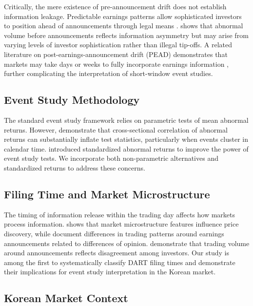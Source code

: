 \documentclass[review,authoryear]{elsarticle}
\begin{document}
Critically, the mere existence of pre-announcement drift does not establish information leakage. Predictable earnings patterns allow sophisticated investors to position ahead of announcements through legal means \citep{atiase1985predisclosure}. \citet{chae2005trading} shows that abnormal volume before announcements reflects information asymmetry but may arise from varying levels of investor sophistication rather than illegal tip-offs. A related literature on post-earnings-announcement drift (PEAD) demonstrates that markets may take days or weeks to fully incorporate earnings information \citep{bernard1989post, bernard1990evidence}, further complicating the interpretation of short-window event studies.

\subsection{Event Study Methodology}

The standard event study framework \citep{brown1985using, mackinlay1997event} relies on parametric tests of mean abnormal returns. However, \citet{kolari2010event} demonstrate that cross-sectional correlation of abnormal returns can substantially inflate test statistics, particularly when events cluster in calendar time. \citet{patell1976corporate} introduced standardized abnormal returns to improve the power of event study tests. We incorporate both non-parametric alternatives and standardized returns to address these concerns.

\subsection{Filing Time and Market Microstructure}

The timing of information release within the trading day affects how markets process information. \citet{lee1993market} shows that market microstructure features influence price discovery, while \citet{berkman2009sell} document differences in trading patterns around earnings announcements related to differences of opinion. \citet{bamber1997trading} demonstrate that trading volume around announcements reflects disagreement among investors. Our study is among the first to systematically classify DART filing times and demonstrate their implications for event study interpretation in the Korean market.

\subsection{Korean Market Context}
\end{document}
